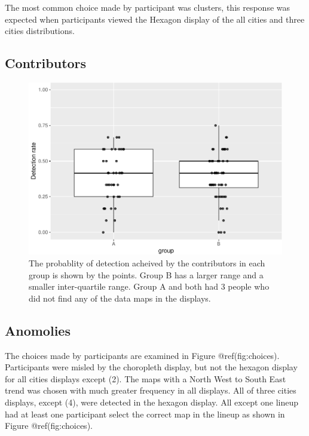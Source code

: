 \documentclass[conference,final,]{IEEEtran}
\makeatletter
\def\maxwidth{\ifdim\Gin@nat@width>\linewidth\linewidth
\else\Gin@nat@width\fi}
\let\Oldincludegraphics\includegraphics
\renewcommand{\includegraphics}[1]{\Oldincludegraphics[width=\maxwidth]{#1}}
\makeatother
\begin{document}
The most common choice made by participant was clusters, this response
was expected when participants viewed the Hexagon display of the all
cities and three cities distributions.

\hypertarget{contributors}{%
\subsection{Contributors}\label{contributors}}

\begin{figure}
\centering
\includegraphics{paper_files/figure-latex/contributors-1.pdf}
\caption{The probablity of detection acheived by the contributors in
each group is shown by the points. Group B has a larger range and a
smaller inter-quartile range. Group A and both had 3 people who did not
find any of the data maps in the displays.}
\end{figure}

\hypertarget{anomolies}{%
\subsection{Anomolies}\label{anomolies}}

The choices made by participants are examined in Figure
@ref(fig:choices). Participants were misled by the choropleth display,
but not the hexagon display for all cities displays except (2). The maps
with a North West to South East trend was chosen with much greater
frequency in all displays. All of three cities displays, except (4),
were detected in the hexagon display. All except one lineup had at least
one participant select the correct map in the lineup as shown in Figure
@ref(fig:choices).
\end{document}
